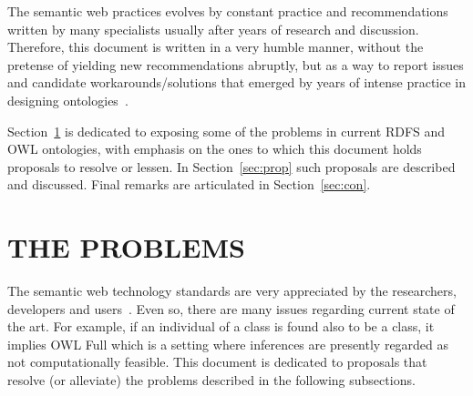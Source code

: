 \documentclass[12pt,fleqn]{article}
\begin{document}
The semantic web practices evolves by constant practice and recommendations written
by many specialists usually after years of research and discussion.
Therefore, this document is written in a very humble manner,
without the pretense of yielding new recommendations abruptly,
but as a way to report issues and candidate workarounds/solutions
that emerged by years of intense practice in designing ontologies~\citep{pnud5,fabbri1,losd,ops}.

Section~\ref{sec:prob} is dedicated to exposing some of the problems
in current RDFS and OWL ontologies, with emphasis on the ones
to which this document holds proposals to resolve or lessen.
In Section~\ref{sec:prop} such proposals are described and discussed.
Final remarks are articulated in Section~\ref{sec:con}.

\section{THE PROBLEMS}\label{sec:prob}
The semantic web technology standards are very appreciated by the researchers, developers and users~\citep{semApr}.
Even so, there are many issues regarding current state of the art.
For example, if an individual of a class is found also to be a class,
it implies OWL Full which is a setting where inferences are presently regarded as not computationally feasible.
This document is dedicated to proposals that resolve (or alleviate)
the problems described in the following subsections.
\end{document}
